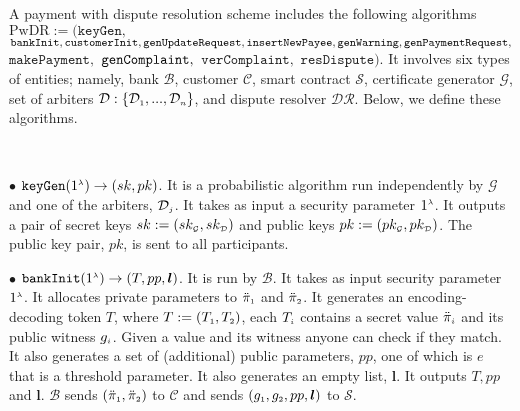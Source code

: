 \begin{definition} A payment with dispute resolution  scheme  includes the following   algorithms $\text{PwDR}:=(\mathtt{keyGen}, $ $\mathtt{bankInit}, \\ \mathtt{customerInit},  \mathtt{genUpdateRequest}, \mathtt{insertNewPayee}, \mathtt{genWarning}, \mathtt{genPaymentRequest}, $ $\mathtt{makePayment}, $ $ \mathtt{genComplaint}, \\ $ $\mathtt{verComplaint},$ $ \mathtt{resDispute})$. It involves  six   types of entities; namely,  bank $\mathcal{B}$, customer $\mathcal{C}$,  smart contract $\mathcal{S}$,  certificate generator $\mathcal{G}$,   set of arbiters $\mathcal{D}:\{\mathcal{D}_{\scriptscriptstyle 1},..., \mathcal{D}_{\scriptscriptstyle n}\}$, and  dispute resolver $\mathcal{DR}$. Below, we define these algorithms.  

%
\

\item [$\bullet$]  $\mathtt{keyGen}(1^{\scriptscriptstyle \lambda})\rightarrow (sk,pk)$. It is a probabilistic  algorithm run independently by  $\mathcal{G}$ and one of the arbiters, $\mathcal{D}_{\scriptscriptstyle j}$. It takes as input a security parameter $1^{\scriptscriptstyle \lambda}$. It outputs a pair of secret keys $sk:=(sk_{\scriptscriptstyle\mathcal {G}},sk_{\scriptscriptstyle\mathcal {D}})$ and public keys $pk:=(pk_{\scriptscriptstyle\mathcal {G}},pk_{\scriptscriptstyle\mathcal {D}})$. The public key pair, $pk$, is sent to all participants. 


\vspace{2mm}
\item[$\bullet$] $\mathtt{bankInit}(1^{\scriptscriptstyle \lambda})\rightarrow (T, pp, \bm{l})$. It is  run by  $\mathcal{B}$. It takes as input  security parameter $1^{\scriptscriptstyle \lambda}$.  It allocates private parameters to  $\ddot\pi_{\scriptscriptstyle 1}$ and $\ddot\pi_{\scriptscriptstyle 2}$. It generates an encoding-decoding token $T$, where  $T:=(T_{\scriptscriptstyle 1},T_{\scriptscriptstyle 2})$,  each $T_{\scriptscriptstyle i}$  contains  a secret value $\ddot\pi_{\scriptscriptstyle i}$ and its public witness $g_{\scriptscriptstyle i}$.    Given a  value and its witness anyone can check if they match. It also generates a set of (additional) public parameters,  $pp$, one of which is $e$ that is a threshold parameter.  It also generates an  empty list, $\bm{l}$. It outputs $T, pp$ and $\bm l$.  $\mathcal{B}$ sends $(\ddot\pi_{\scriptscriptstyle 1}, \ddot\pi_{\scriptscriptstyle 2})$ to $\mathcal{C}$ and sends $(g_{\scriptscriptstyle 1}, g_{\scriptscriptstyle 2},  pp, \bm {l})$ to $\mathcal{S}$.


\end{definition}
